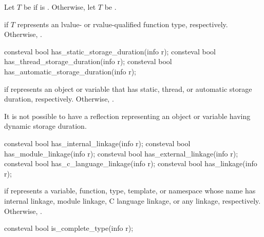 \begin{itemdescr}
\pnum
Let $T$ be  if  is .
Otherwise, let $T$ be .

\pnum
\returns
{} if $T$ represents an
lvalue- or rvalue-qualified function type, respectively.
Otherwise, .
\end{itemdescr}

%
%
%
\begin{itemdecl}
consteval bool has_static_storage_duration(info r);
consteval bool has_thread_storage_duration(info r);
consteval bool has_automatic_storage_duration(info r);
\end{itemdecl}

\begin{itemdescr}
\pnum
\returns
{} if  represents an object or variable that has
static, thread, or automatic storage duration, respectively.
Otherwise, .
\begin{note}
It is not possible to have a reflection
representing an object or variable having dynamic storage duration.
\end{note}
\end{itemdescr}

%
%
%
%
%
\begin{itemdecl}
consteval bool has_internal_linkage(info r);
consteval bool has_module_linkage(info r);
consteval bool has_external_linkage(info r);
consteval bool has_c_language_linkage(info r);
consteval bool has_linkage(info r);
\end{itemdecl}

\begin{itemdescr}
\pnum
\returns
{} if  represents a
variable,
function,
type,
template, or
namespace
whose name has
internal linkage,
module linkage,
C language linkage, or
any linkage, respectively.
Otherwise, .
\end{itemdescr}

%
\begin{itemdecl}
consteval bool is_complete_type(info r);
\end{itemdecl}

